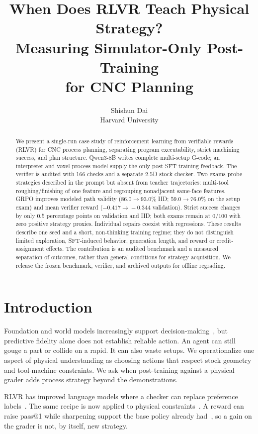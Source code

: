\documentclass{article}
\title{When Does RLVR Teach Physical Strategy?\\
Measuring Simulator-Only Post-Training\\for CNC Planning}
\author{%
  Shishun Dai \\
  Harvard University
}
\begin{document}
\maketitle

\begin{abstract}
We present a single-run case study of reinforcement learning from
verifiable rewards (RLVR) for CNC process planning, separating program
executability, strict machining success, and plan structure. Qwen3-8B
writes complete multi-setup G-code; an interpreter and voxel process
model supply the only post-SFT training feedback. The verifier is
audited with 166 checks and a separate 2.5D stock checker. Two exams
probe strategies described in the prompt but absent from teacher
trajectories: multi-tool roughing/finishing of one feature and regrouping
nonadjacent same-face features. GRPO improves modeled path validity
($86.0\!\to\!93.0\%$ IID; $59.0\!\to\!76.0\%$ on the setup exam)
and mean verifier reward ($-0.417\!\to\!-0.344$ validation).
Strict success changes by only $0.5$ percentage points on validation
and IID; both exams remain at $0/100$ with zero positive strategy
proxies. Individual repairs coexist with regressions. These results
describe one seed and a short, non-thinking training regime; they do
not distinguish limited exploration, SFT-induced behavior, generation
length, and reward or credit-assignment effects. The contribution is
an audited benchmark and a measured separation of outcomes, rather
than general conditions for strategy acquisition. We release the
frozen benchmark, verifier, and archived outputs for offline regrading.
\end{abstract}

\section{Introduction}
\label{sec:intro}

Foundation and world models increasingly support
decision-making~\citep{ha2018worldmodels,hafner2023dreamerv3,yang2024unisim,bruce2024genie,hu2023gaia1},
but predictive fidelity alone does not establish reliable action.  An
agent can still gouge a part or collide on a rapid.  It can also waste
setups.  We operationalize one aspect of physical understanding as
choosing actions that respect stock geometry and tool-machine
constraints.  We ask when post-training against a
physical grader adds process strategy beyond the demonstrations.

RLVR has improved language models where a checker can replace
preference
labels~\citep{lambert2024tulu3,guo2025deepseekr1,shao2024deepseekmath}.
The same recipe is now applied to physical
constraints~\citep{ji2025grounded}.  A reward can raise pass@1 while
sharpening support the base policy already
had~\citep{yue2025rlcapacity,yuan2026diversity}, so a gain on the
grader is not, by itself, new strategy.
\end{document}
